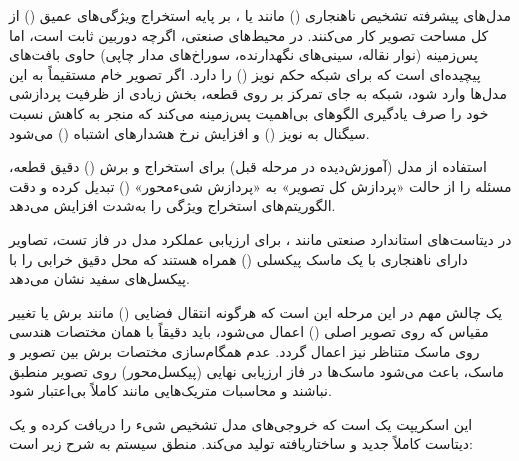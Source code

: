 \documentclass{article}
\begin{document}
مدل‌های پیشرفته تشخیص ناهنجاری () مانند  یا ، بر پایه استخراج ویژگی‌های عمیق () از کل مساحت تصویر کار می‌کنند. در محیط‌های صنعتی، اگرچه دوربین ثابت است، اما پس‌زمینه (نوار نقاله، سینی‌های نگهدارنده، سوراخ‌های مدار چاپی) حاوی بافت‌های پیچیده‌ای است که برای شبکه حکم نویز () را دارد. اگر تصویر خام مستقیماً به این مدل‌ها وارد شود، شبکه به جای تمرکز بر روی قطعه، بخش زیادی از ظرفیت پردازشی خود را صرف یادگیری الگوهای بی‌اهمیت پس‌زمینه می‌کند که منجر به کاهش نسبت سیگنال به نویز () و افزایش نرخ هشدارهای اشتباه () می‌شود.

استفاده از مدل  (آموزش‌دیده در مرحله قبل) برای استخراج و برش () دقیق قطعه، مسئله را از حالت «پردازش کل تصویر» به «پردازش شیءمحور» () تبدیل کرده و دقت الگوریتم‌های استخراج ویژگی را به‌شدت افزایش می‌دهد.


در دیتاست‌های استاندارد صنعتی مانند ، برای ارزیابی عملکرد مدل در فاز تست، تصاویر دارای ناهنجاری با یک ماسک پیکسلی () همراه هستند که محل دقیق خرابی را با پیکسل‌های سفید نشان می‌دهد.

یک چالش مهم در این مرحله این است که هرگونه انتقال فضایی () مانند برش یا تغییر مقیاس  که روی تصویر اصلی () اعمال می‌شود، باید دقیقاً با همان مختصات هندسی روی ماسک متناظر نیز اعمال گردد. عدم همگام‌سازی مختصات برش بین تصویر و ماسک، باعث می‌شود ماسک‌ها در فاز ارزیابی نهایی (پیکسل‌محور) روی تصویر منطبق نباشند و محاسبات متریک‌هایی مانند  کاملاً بی‌اعتبار شود.

این اسکریپت یک  است که خروجی‌های مدل تشخیص شیء را دریافت کرده و یک دیتاست کاملاً جدید و ساختاریافته تولید می‌کند. منطق سیستم به شرح زیر است:
\end{document}
